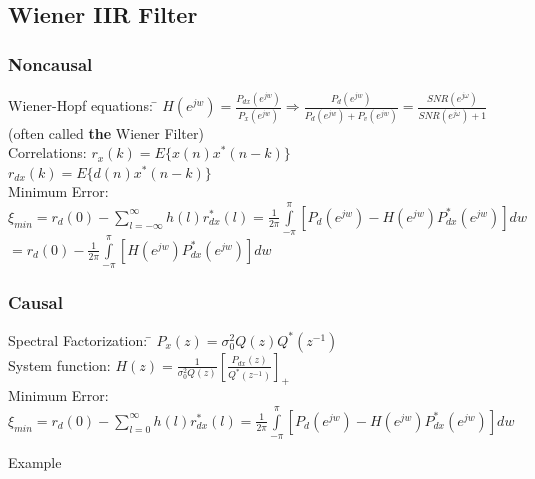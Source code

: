 \subsection{Wiener IIR Filter}
\begin{minipage}{8cm}
\subsubsection{Noncausal }
\begin{tabbing}
Wiener-Hopf equations: \=
$H(e^{jw})=\frac{P_{dx}(e^{jw})}{P_{x}(e^{jw})}  \Rightarrow
\frac{P_{d}(e^{jw})}{P_{d}(e^{jw}) + P_{v}(e^{jw})}= \frac{SNR(e^{j\omega})}{SNR(e^{j\omega}) + 1}$ (often called \textbf{the} Wiener Filter) \\

Correlations: \>
	$r_x(k) =E \{ x(n)x^{*}(n-k) \} $\\
	\>$r_{dx}(k) =E\{d(n)x^{*}(n-k)\}$\\


Minimum Error:\>
	$\xi_{min} =r_d(0)-\sum \limits_{l=-\infty}^\infty h(l)r_{dx}^{*}(l)
	=\frac{1}{2\pi}\int \limits_{-\pi}^\pi[P_d(e^{jw})-H(e^{jw})P_{dx}^{*}(e^{jw})]dw$\\
	\>$=r_d(0)-\frac{1}{2\pi}\int \limits_{-\pi}^\pi[H(e^{jw})P_{dx}^{*}(e^{jw})]dw$
\end{tabbing}

\end{minipage}

\subsubsection{Causal }
\begin{tabbing}
Spectral Factorization: \=
$ P_x(z) = \sigma_0^2 Q(z) Q^*(z^{-1}) $\\

System function:\hspace{1.2cm}\>
	$H(z)=\frac{1}{\sigma_0^2 Q(z) } [\frac{P_{dx}(z)}{Q^*(z^{-1})} ]_+ $ \\

Minimum Error:\>$\xi_{min} =r_d(0)-\sum \limits_{l=0}^\infty h(l)r_{dx}^{*}(l)
	=\frac{1}{2\pi}\int \limits_{-\pi}^\pi[P_d(e^{jw})-H(e^{jw})P_{dx}^{*}(e^{jw})]dw$\\

\end{tabbing}
Example 

